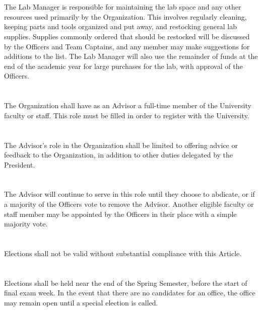 \documentclass[12pt]{cls/constitution}
\begin{document}
\section{}
The Lab Manager is responsible for maintaining the lab space and any other resources used primarily by the Organization. This involves regularly cleaning, keeping parts and tools organized and put away, and restocking general lab supplies. Supplies commonly ordered that should be restocked will be discussed by the Officers and Team Captains, and any member may make suggestions for additions to the list. The Lab Manager will also use the remainder of funds at the end of the academic year for large purchases for the lab, with approval of the Officers.

\section{}
The Organization shall have as an Advisor a full-time member of the University faculty or staff. This role must be filled in order to register with the University.

\section{}
The Advisor’s role in the Organization shall be limited to offering advice or feedback to the Organization, in addition to other duties delegated by the President.

\section{}
The Advisor will continue to serve in this role until they choose to abdicate, or if a majority of the Officers vote to remove the Advisor. Another eligible faculty or staff member may be appointed by the Officers in their place with a simple majority vote.


\section{}
Elections shall not be valid without substantial compliance with this Article. 

\section{}
Elections shall be held near the end of the Spring Semester, before the start of final exam week. In the event that there are no candidates for an office, the office may remain open until a special election is called. 
\end{document}
